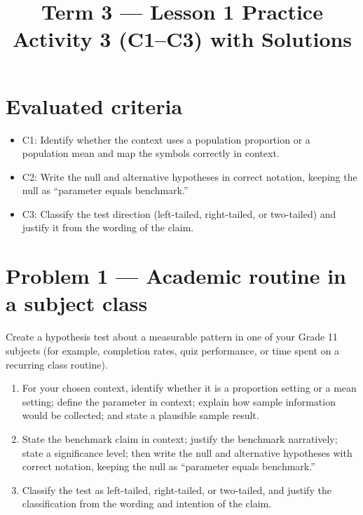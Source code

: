 \makeatletter
{}
\makeatother	



\title{Term 3 --- Lesson 1 Practice Activity 3 (C1--C3) with Solutions}
\author{}
\date{}


	
	\maketitle

	\setcounter{tocdepth}{1}
	\setcounter{secnumdepth}{2}
	\tableofcontents

	\section*{Evaluated criteria}
	\begin{itemize}
		\item C1: Identify whether the context uses a population proportion or a population mean and map the symbols correctly in context.
		\item C2: Write the null and alternative hypotheses in correct notation, keeping the null as ``parameter equals benchmark.''
		\item C3: Classify the test direction (left-tailed, right-tailed, or two-tailed) and justify it from the wording of the claim.
	\end{itemize}

	\section{Problem 1 --- Academic routine in a subject class}
	Create a hypothesis test about a measurable pattern in one of your Grade 11 subjects (for example, completion rates, quiz performance, or time spent on a recurring class routine).
	
	\begin{enumerate}
		\item[(C1)] For your chosen context, identify whether it is a proportion setting or a mean setting; define the parameter in context; explain how sample information would be collected; and state a plausible sample result.
		\item[(C2)] State the benchmark claim in context; justify the benchmark narratively; state a significance level; then write the null and alternative hypotheses with correct notation, keeping the null as ``parameter equals benchmark.''
		\item[(C3)] Classify the test as left-tailed, right-tailed, or two-tailed, and justify the classification from the wording and intention of the claim.
	\end{enumerate}
	
